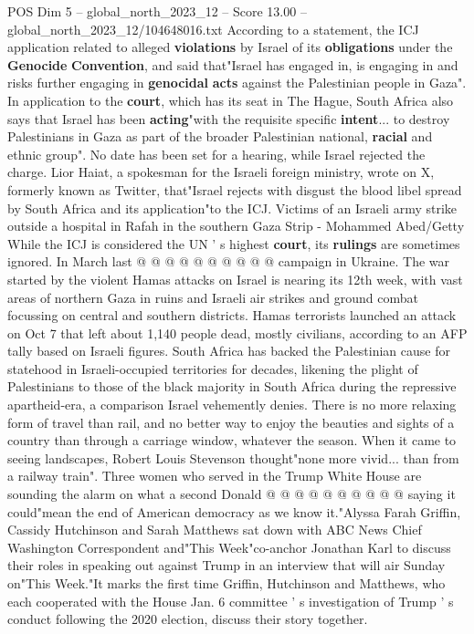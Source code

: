 \begin{textsample}{POS Dim 5 – global\_north\_2023\_12 – Score 13.00 – global\_north\_2023\_12/104648016.txt}  \label{ex:f5_pos_346}
According to a statement, the ICJ application related to alleged \textbf{violations} by Israel of its \textbf{obligations} under the \textbf{Genocide} \textbf{Convention}, and said that"Israel has engaged in, is engaging in and risks further engaging in \textbf{genocidal} \textbf{acts} against the Palestinian people in Gaza".
In application to the \textbf{court}, which has its seat in The Hague, South Africa also says that Israel has been \textbf{acting}"with the requisite specific \textbf{intent}... to destroy Palestinians in Gaza as part of the broader Palestinian national, \textbf{racial} and ethnic group".
No date has been set for a hearing, while Israel rejected the charge.
Lior Haiat, a spokesman for the Israeli foreign ministry, wrote on X, formerly known as Twitter, that"Israel rejects with disgust the blood libel spread by South Africa and its application"to the ICJ.
Victims of an Israeli army strike outside a hospital in Rafah in the southern Gaza Strip - Mohammed Abed/Getty While the ICJ is considered the UN ' s highest \textbf{court}, its \textbf{rulings} are sometimes ignored.
In March last @ @ @ @ @ @ @ @ @ @ campaign in Ukraine.
The war started by the violent Hamas attacks on Israel is nearing its 12th week, with vast areas of northern Gaza in ruins and Israeli air strikes and ground combat focussing on central and southern districts.
Hamas terrorists launched an attack on Oct 7 that left about 1,140 people dead, mostly civilians, according to an AFP tally based on Israeli figures.
South Africa has backed the Palestinian cause for statehood in Israeli-occupied territories for decades, likening the plight of Palestinians to those of the black majority in South Africa during the repressive apartheid-era, a comparison Israel vehemently denies.
There is no more relaxing form of travel than rail, and no better way to enjoy the beauties and sights of a country than through a carriage window, whatever the season.
When it came to seeing landscapes, Robert Louis Stevenson thought"none more vivid... than from a railway train".
Three women who served in the Trump White House are sounding the alarm on what a second Donald @ @ @ @ @ @ @ @ @ @ saying it could"mean the end of American democracy as we know it."Alyssa Farah Griffin, Cassidy Hutchinson and Sarah Matthews sat down with ABC News Chief Washington Correspondent and"This Week"co-anchor Jonathan Karl to discuss their roles in speaking out against Trump in an interview that will air Sunday on"This Week."It marks the first time Griffin, Hutchinson and Matthews, who each cooperated with the House Jan. 6 committee ' s investigation of Trump ' s conduct following the 2020 election, discuss their story together.

\end{textsample}
